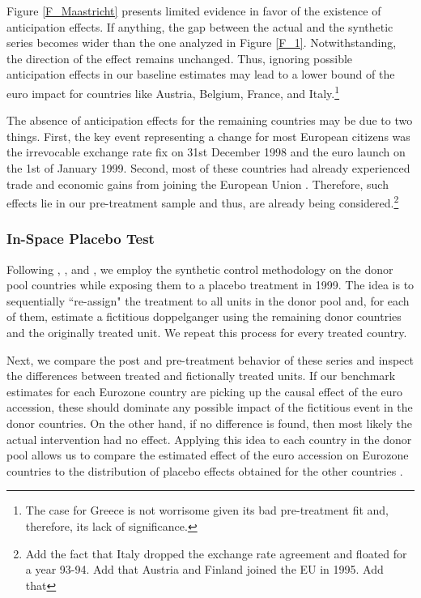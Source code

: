 \documentclass[12pt]{article}
\begin{document}
Figure \ref{F_Maastricht} presents limited evidence in favor of the existence of anticipation effects. If anything, the gap between the actual and the synthetic series becomes wider than the one analyzed in Figure \ref{F_1}. Notwithstanding, the direction of the effect remains unchanged. Thus, ignoring possible anticipation effects in our baseline estimates may lead to a lower bound of the euro impact for countries like Austria, Belgium, France, and Italy.\footnote{The case for Greece is not worrisome given its bad pre-treatment fit and, therefore, its lack of significance.}

The absence of anticipation effects for the remaining countries may be due to two things. First, the key event representing a change for most European citizens was the irrevocable exchange rate fix on 31st December 1998 and the euro launch on the 1st of January 1999. Second, most of these countries had already experienced trade and economic gains from joining the European Union \citep{Campos2018}. Therefore, such effects lie in our pre-treatment sample and thus, are already being considered.\footnote{Add the fact that Italy dropped the exchange rate agreement and floated for a year 93-94. Add that Austria and Finland joined the EU in 1995. Add that }


\subsubsection{In-Space Placebo Test \label{SS_spaceplacebo}}

Following \cite{Abadie2010}, \cite{Abadie2018}, and \cite{Firpo2018}, we employ the synthetic control methodology on the donor pool countries while exposing them to a placebo treatment in 1999. The idea is to sequentially ``re-assign" the treatment to all units in the donor pool and, for each of them, estimate a fictitious doppelganger using the remaining donor countries and the originally treated unit. We repeat this process for every treated country.

Next, we compare the post and pre-treatment behavior of these series and inspect the differences between treated and fictionally treated units. If our benchmark estimates for each Eurozone country are picking up the causal effect of the euro accession, these should dominate any possible impact of the fictitious event in the donor countries. On the other hand, if no difference is found, then most likely the actual intervention had no effect. Applying this idea to each country in the donor pool allows us to compare the estimated effect of the euro accession on Eurozone countries to the distribution of placebo effects obtained for the other countries \citep{Abadie2015}.
\end{document}
